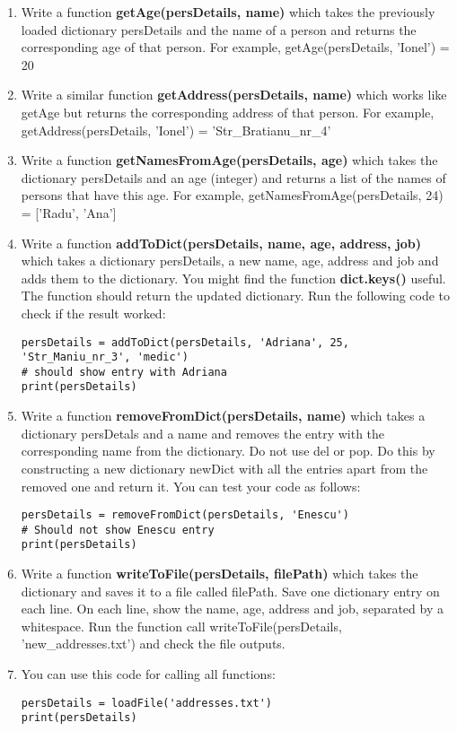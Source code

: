 \documentclass[11pt,a4paper]{report}
\begin{document}
\begin{enumerate}
 \item Write a function \textbf{getAge(persDetails, name)} which takes the previously loaded dictionary persDetails and the name of a person and returns the corresponding age of that person. For example, getAge(persDetails, 'Ionel') = 20 
 \item Write a similar function \textbf{getAddress(persDetails, name)} which works like getAge but returns the corresponding address of that person. For example, getAddress(persDetails, 'Ionel') = 'Str\_Bratianu\_nr\_4'
 \item Write a function \textbf{getNamesFromAge(persDetails, age)} which takes the dictionary persDetails and an age (integer) and returns a list of the names of persons that have this age. For example, getNamesFromAge(persDetails, 24) = ['Radu', 'Ana']
 \item Write a function \textbf{addToDict(persDetails, name, age, address, job)} which takes a dictionary persDetails, a new name, age, address and job and adds them to the dictionary. You might find the function \textbf{dict.keys()} useful. The function should return the updated dictionary. Run the following code to check if the result worked:
   \begin{lstlisting}
persDetails = addToDict(persDetails, 'Adriana', 25, 'Str_Maniu_nr_3', 'medic')
# should show entry with Adriana
print(persDetails)
   \end{lstlisting}
 \item  Write a function \textbf{removeFromDict(persDetails, name)} which takes a dictionary persDetals and a name and removes the entry with the corresponding name from the dictionary. Do not use del or pop. Do this by constructing a new dictionary newDict with all the entries apart from the removed one and return it. You can test your code as follows:
    \begin{lstlisting}
persDetails = removeFromDict(persDetails, 'Enescu')
# Should not show Enescu entry
print(persDetails)
   \end{lstlisting}
 \item Write a function \textbf{writeToFile(persDetails, filePath)} which takes the dictionary and saves it to a file called filePath. Save one dictionary entry on each line. On each line, show the name, age, address and job, separated by a whitespace. Run the function call writeToFile(persDetails, 'new\_addresses.txt') and check the file outputs. 
 
 \item You can use this code for calling all functions:
 \begin{lstlisting}
persDetails = loadFile('addresses.txt')
print(persDetails)


\end{lstlisting}
\end{enumerate}
\end{document}
